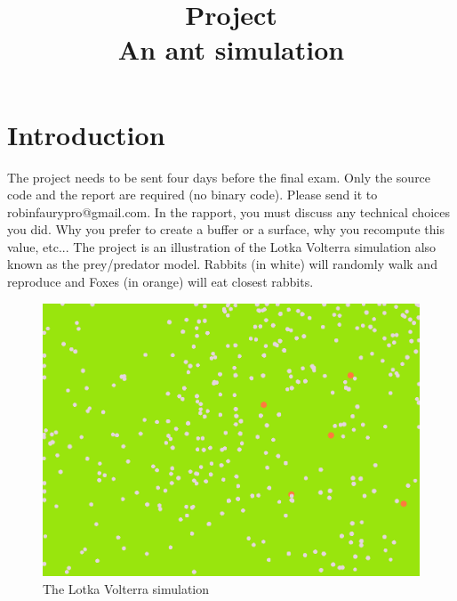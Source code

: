 \documentclass{article}
\begin{document}
\title{Project\\An ant simulation}
\maketitle

\section{Introduction}
The project needs to be sent four days before the final exam. Only the source code and the report are required (no binary code). Please send it to robinfaurypro@gmail.com. In the rapport, you must discuss any technical choices you did. Why you prefer to create a buffer or a surface, why you recompute this value, etc...
The project is an illustration of the Lotka Volterra simulation also known as the prey/predator model. Rabbits (in white) will randomly walk and reproduce and Foxes (in orange) will eat closest rabbits. 
\begin{figure}[H]
	\centering
	\includegraphics[scale=0.54]{figures/project.png}
	\caption{The Lotka Volterra simulation}
\end{figure}
\end{document}
